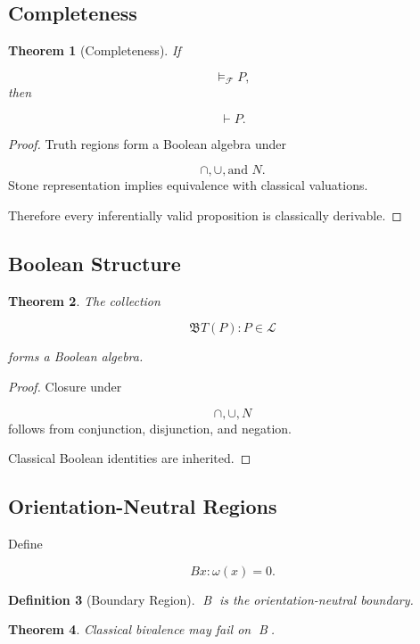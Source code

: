 \documentclass[12pt]{article}
\newtheorem{theorem}{Theorem}[section]
\newtheorem{definition}[theorem]{Definition}
\theoremstyle{remark}
\begin{document}
\subsection{Completeness}

\begin{theorem}[Completeness]
If

\[
\models_{\mathcal F} P,
\]
then

\[
\vdash P.
\]
\end{theorem}
\begin{proof}
Truth regions form a Boolean algebra under

\[
\cap,
\cup,
\text{and }
N.
\]
Stone representation implies equivalence with classical valuations.

Therefore every inferentially valid proposition is classically derivable.
\end{proof}

\subsection{Boolean Structure}

\begin{theorem}
The collection

\[
\mathfrak B
{
T(P):P\in\mathcal L
}
\]

forms a Boolean algebra.
\end{theorem}

\begin{proof}
Closure under

\[
\cap,
\cup,
N
\]
follows from conjunction, disjunction, and negation.

Classical Boolean identities are inherited.
\end{proof}

\subsection{Orientation-Neutral Regions}

Define

\[
B
{
x:
\omega(x)=0
}.
\]

\begin{definition}[Boundary Region]
B is the orientation-neutral boundary.
\end{definition}

\begin{theorem}
Classical bivalence may fail on B.
\end{theorem}
\end{document}
